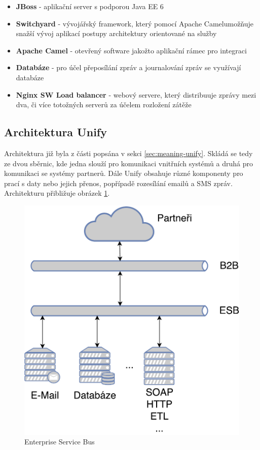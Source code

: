 \documentclass[thesis=M,czech]{FITthesis}[2012/10/20]
\newcommand{\tmpframe}[1]{\fbox{#1}}
\renewcommand{\tmpframe}[1]{#1}
\begin{document}
			\begin{itemize} 
				\item \textbf{JBoss} - aplikační server s podporou Java EE 6 \cite{oracleJavaEE6}
				\item \textbf{Switchyard} - vývojářský framework, který pomocí Apache Camel\texttrademark  umožňuje snažší vývoj aplikací postupy architektury orientované na služby 
				\item \textbf{Apache Camel \texttrademark } - otevřený software jakožto aplikační rámec pro integraci
				\item \textbf{Databáze} - pro účel přeposílání zpráv a journalování zpráv se využívají databáze
				\item \textbf{Nginx SW Load balancer} - webový servere, který distribuuje zprávy mezi dva, či více totožných serverů za účelem rozložení zátěže   		
			\end{itemize}
			
			
		\subsection{Architektura Unify}
			Architektura již byla z části popsána v sekci \ref{sec:meaning-unify}. Skládá se tedy ze dvou sběrnic, kde jedna slouží pro komunikaci vnitřních systémů a druhá pro komunikaci se systémy partnerů. Dále Unify obsahuje různé komponenty pro prací s daty nebo jejich přenos, popřípadě rozesílání emailů a SMS zpráv.
			Architekturu přibližuje obrázek \ref{fig:esb}. 
			
			\begin{figure}[htb]\centering
				\tmpframe{\includegraphics[scale=0.5]{./img/Unify-Easy}}		
				\caption{Enterprise Service Bus}
				\label{fig:esb}
			\end{figure}
		
\end{document}
